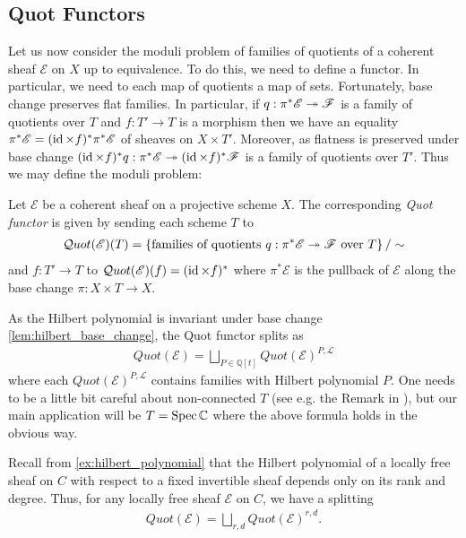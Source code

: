 \documentclass[12pt]{ociamthesis}  %
\begin{document}
\subsection{Quot Functors}

Let us now consider the moduli problem of families of
quotients of a coherent sheaf $\mathscr E$ on $X$ up to equivalence.
To do this, we need to define a functor. In particular, we need to
each map of quotients a map of sets. Fortunately, base change preserves flat families.
In particular,
if $q : \pi^*\mathscr E \twoheadrightarrow \mathscr F$ is a family of quotients over $T$ and
$f : T' \to T$ is a morphism then we have an equality
$\pi^*\mathscr E = (\operatorname{id}\times f)^*\pi^*\mathscr E$
of sheaves on $X\times T'$.
Moreover, as flatness is preserved under base change \cite[\href{https://stacks.math.columbia.edu/tag/01U9}{Tag 01U9}]{stacks-project}
$(\operatorname{id}\times f)^*q : \pi^*\mathscr E \twoheadrightarrow (\operatorname{id}\times f)^*\mathscr F$
is a family of quotients over $T'$. Thus we may define the moduli problem:

\begin{definition}
  Let $\mathscr E$ be a coherent sheaf on a projective scheme $X$.
  The corresponding \emph{Quot functor} is given by sending each
  scheme $T$ to
  \begin{align*}
    \mathcal Quot (\mathscr E)(T) = \left\lbrace{
      \text{families of quotients $q : \pi^*\mathscr E \twoheadrightarrow \mathscr F$
        over $T$}
    }\right\rbrace / \sim
  \end{align*}
  and $f : T' \to T$ to
  $\mathcal Quot(\mathscr E)(f) = (\operatorname{id} \times f)^*$ where
  $\pi^*\mathscr E$ is the pullback of $\mathscr E$ along
  the base change $\pi:X\times T\to X$.
\end{definition}

As the Hilbert polynomial is invariant under base change
\ref{lem:hilbert_base_change}, the Quot functor splits as
\begin{align*}
  Quot(\mathscr E)
  = \bigsqcup_{P\in\mathbb{Q}[t]} Quot(\mathscr E)^{P,\mathscr L}
\end{align*}
where each $Quot(\mathscr E)^{P,\mathscr L}$ contains families
with Hilbert polynomial $P$. One needs to be a little bit careful
about non-connected $T$ (see e.g. the Remark in \cite[5-6]{siddharth2016}), but our main application will be
$T = \operatorname{Spec}\mathbb C$ where the above formula holds in the obvious way.

\begin{example}
  Recall from \ref{ex:hilbert_polynomial} that the Hilbert polynomial of a
  locally free sheaf on $C$ with respect to a fixed invertible sheaf depends
  only on its rank and degree.  Thus, for any locally free sheaf $\mathscr E$ on
  $C$, we have a splitting
  \begin{align}\label{eq:quot_functor_split_on_c}
    Quot(\mathscr E) = \bigsqcup_{r,d} Quot(\mathscr E)^{r,d}.
  \end{align}
  \missingexample
\end{example}
\end{document}
